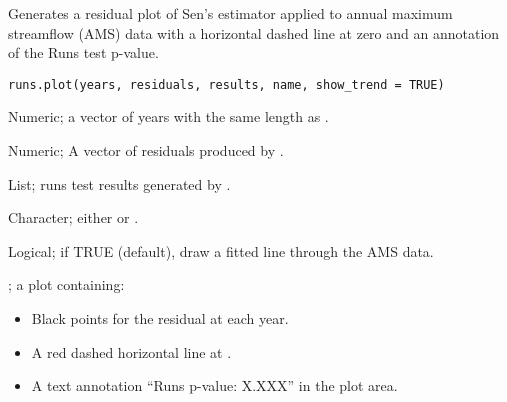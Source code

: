 \documentclass[a4paper]{book}
\begin{document}
%
\begin{Description}
Generates a residual plot of Sen’s estimator applied to annual maximum streamflow
(AMS) data with a horizontal dashed line at zero and an annotation of the Runs
test p-value.
\end{Description}
%
\begin{Usage}
\begin{verbatim}
runs.plot(years, residuals, results, name, show_trend = TRUE)
\end{verbatim}
\end{Usage}
%
\begin{Arguments}
\begin{ldescription}
\item[\code{years}] Numeric; a vector of years with the same length as .

\item[\code{residuals}] Numeric; A vector of residuals produced by .

\item[\code{results}] List; runs test results generated by .

\item[\code{name}] Character; either  or .

\item[\code{show\_trend}] Logical; if TRUE (default), draw a fitted line through the AMS data.
\end{ldescription}
\end{Arguments}
%
\begin{Value}
; a plot containing:
\begin{itemize}

\item{} Black points for the residual at each year.
\item{} A red dashed horizontal line at .
\item{} A text annotation “Runs p-value: X.XXX” in the plot area.

\end{itemize}

\end{Value}
%
\begin{SeeAlso}
\end{SeeAlso}
%
\begin{Examples}
\end{Examples}
\end{document}
